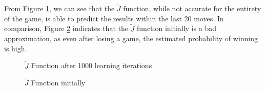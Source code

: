 \documentclass[11pt,twocolumn]{article}
\begin{document}
From Figure \ref{JFunctionGraphs_1000iterations}, we can see that the $\tilde{J}$ function, while not accurate for the entirety of the game, is able to predict the results within the last 20 moves. In comparison, Figure \ref{JFunctionGraphs_1iteration} indicates that the $\tilde{J}$ function initially is a bad approximation, as even after losing a game, the estimated probability of winning is high.
\begin{figure}[H]

    \caption{$\tilde{J}$ Function after 1000 learning iterations}
    \label{JFunctionGraphs_1000iterations}
\end{figure}
\begin{figure}[H]

    \caption{$\tilde{J}$ Function initially}
    \label{JFunctionGraphs_1iteration}
\end{figure}
\end{document}
